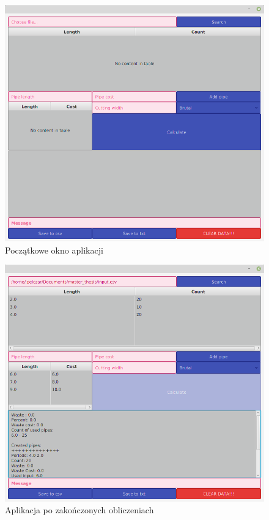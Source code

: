 \begin{figure}[h]
  \center
  \includegraphics[scale=0.35]{../image/empty_win.png}
  \caption{Początkowe okno aplikacji}
  \label{fig:empty_win}
\end{figure}

\begin{figure}[H]
  \center
  \includegraphics[scale=0.35]{../image/fill_win.png}
  \caption{Aplikacja po zakończonych obliczeniach}
  \label{fig:fill_win}
\end{figure}

